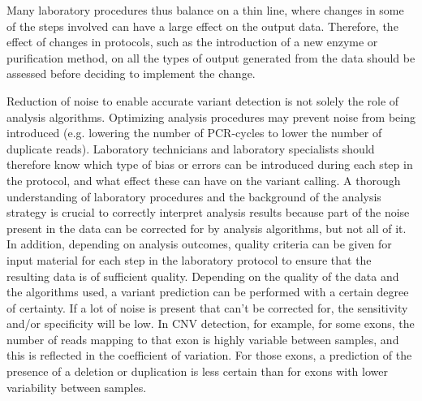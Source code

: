 Many laboratory procedures thus balance on a thin line, where changes in some of the steps involved can have a large effect on the output data. 
Therefore, the effect of changes in protocols, such as the introduction of a new enzyme or purification method, on all the types of output generated from the data should be assessed before deciding to implement the change.

Reduction of noise to enable accurate variant detection is not solely the role of analysis algorithms. 
Optimizing analysis procedures may prevent noise from being introduced (e.g. lowering the number of PCR-cycles to lower the number of duplicate reads). 
Laboratory technicians and laboratory specialists should therefore know which type of bias or errors can be introduced during each step in the protocol, and what effect these can have on the variant calling. 
A thorough understanding of laboratory procedures and the background of the analysis strategy is crucial to correctly interpret analysis results because part of the noise present in the data can be corrected for by analysis algorithms, but not all of it. 
In addition, depending on analysis outcomes, quality criteria can be given for input material for each step in the laboratory protocol to ensure that the resulting data is of sufficient quality. Depending on the quality of the data and the algorithms used, a variant prediction can be performed with a certain degree of certainty. 
If a lot of noise is present that can’t be corrected for, the sensitivity and/or specificity will be low. 
In CNV detection, for example, for some exons, the number of reads mapping to that exon is highly variable between samples, and this is reflected in the coefficient of variation. For those exons, a prediction of the presence of a deletion or duplication is less certain than for exons with lower variability between samples.

